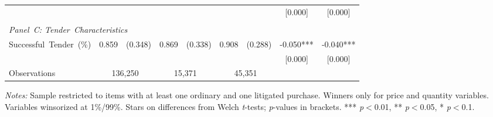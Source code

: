 \begin{table}[ht]
\begin{threeparttable}
\begin{tabular}{lcccccccc}
     & & & & & & & [0.000] & [0.000] \\
    \\[3pt]
    \multicolumn{9}{l}{\textit{Panel~C: Tender~Characteristics}} \\[3pt]
    Successful~Tender~(\%) & 0.859 & (0.348) & 0.869 & (0.338) & 0.908 & (0.288) & -0.050*** & -0.040*** \\
     & & & & & & & [0.000] & [0.000] \\
    \hline
    Observations & \multicolumn{2}{c}{136,250} & \multicolumn{2}{c}{15,371} & \multicolumn{2}{c}{45,351} & & \\
    \hline\hline
  \end{tabular}
  \begin{tablenotes}
    \small
    \item \textit{Notes:} Sample restricted to items with at least one ordinary and one litigated purchase. Winners only for price and quantity variables. Variables winsorized at 1\%/99\%. Stars on differences from Welch \textit{t}-tests; \textit{p}-values in brackets. *** \textit{p}$<$0.01, ** \textit{p}$<$0.05, * \textit{p}$<$0.1.
  \end{tablenotes}
  \end{threeparttable}
\end{table}
